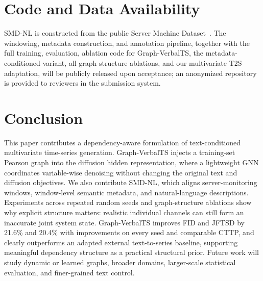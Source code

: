 \documentclass[conference]{IEEEtran}
\begin{document}
\section{Code and Data Availability}

SMD-NL is constructed from the public Server Machine Dataset~\cite{su2019omnianomaly}. The windowing, metadata construction, and annotation pipeline, together with the full training, evaluation, ablation code for Graph-VerbalTS, the metadata-conditioned variant, all graph-structure ablations, and our multivariate T2S adaptation, will be publicly released upon acceptance; an anonymized repository is provided to reviewers in the submission system.

\section{Conclusion}

This paper contributes a dependency-aware formulation of text-conditioned multivariate time-series generation. Graph-VerbalTS injects a training-set Pearson graph into the diffusion hidden representation, where a lightweight GNN coordinates variable-wise denoising without changing the original text and diffusion objectives. We also contribute SMD-NL, which aligns server-monitoring windows, window-level semantic metadata, and natural-language descriptions. Experiments across repeated random seeds and graph-structure ablations show why explicit structure matters: realistic individual channels can still form an inaccurate joint system state. Graph-VerbalTS improves FID and JFTSD by 21.6\% and 20.4\% with improvements on every seed and comparable CTTP, and clearly outperforms an adapted external text-to-series baseline, supporting meaningful dependency structure as a practical structural prior. Future work will study dynamic or learned graphs, broader domains, larger-scale statistical evaluation, and finer-grained text control.



\end{document}
